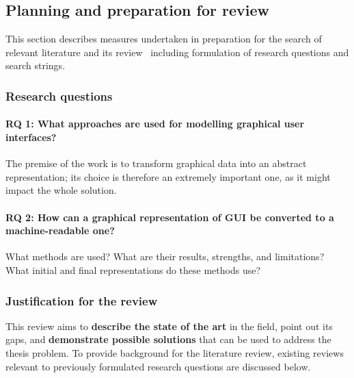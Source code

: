 \subsection[Planning and preparation]{Planning and preparation for review}\label{subsec:planning-and-preparation-for-review}

This section describes measures undertaken in preparation for the search of relevant literature and its review \textendash\ including formulation of research questions and search strings.

\subsubsection{Research questions}


\paragraph{RQ 1: What approaches are used for modelling graphical user interfaces?}
The premise of the work is to transform graphical data into an abstract representation;
its choice is therefore an extremely important one, as it might impact the whole solution.

\paragraph{RQ 2: How can a graphical representation of GUI be converted to a machine-readable one?}
What methods are used?
What are their results, strengths, and limitations?
What initial and final representations do these methods use?

\subsubsection[Justification]{Justification for the review}

This review aims to \textbf{describe the state of the art} in the field, point out its gaps, and \textbf{demonstrate possible solutions} that can be used to address the thesis problem.
To provide background for the literature review, existing reviews
relevant to previously formulated research questions are discussed below.

